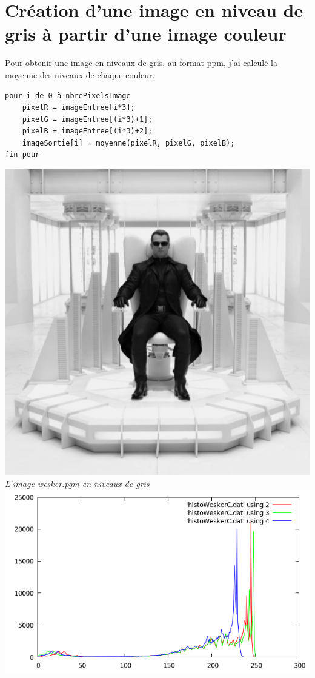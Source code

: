 \documentclass[a4paper,11pt]{article}
\begin{document}
\section{Création d'une image en niveau de gris à partir d'une image couleur}
Pour obtenir une image en niveaux de gris, au format ppm, j'ai calculé la moyenne des niveaux de chaque couleur.
\begin{verbatim}
pour i de 0 à nbrePixelsImage
    pixelR = imageEntree[i*3];
    pixelG = imageEntree[(i*3)+1];
    pixelB = imageEntree[(i*3)+2];
    imageSortie[i] = moyenne(pixelR, pixelG, pixelB);
fin pour
\end{verbatim}
\vspace{1cm}
\begin{center}
\includegraphics[scale=0.7]{weskergrisifie.png}\\
\textit{L'image wesker.pgm en niveaux de gris}
\includegraphics[scale=0.55]{histoWeskerC.png}

\end{center}
\end{document}
